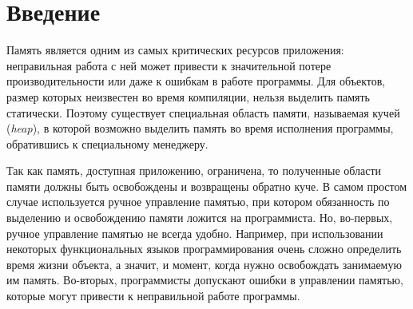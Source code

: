 \documentclass[14pt]{matmex-diploma}
\begin{document}

\maketitle
\tableofcontents

\section*{Введение}
Память является одним из самых критических ресурсов приложения: неправильная работа с ней
может привести к значительной потере производительности или даже к ошибкам в
работе программы. Для объектов, размер которых неизвестен во время компиляции, нельзя выделить память статически. Поэтому существует специальная область памяти, называемая кучей (\textit{heap}),
в которой возможно выделить память во время исполнения программы, обратившись к специальному менеджеру.

Так как память, доступная приложению, ограничена, то полученные области памяти должны быть освобождены и возвращены обратно куче. В самом простом случае используется ручное управление памятью, при котором обязанность по выделению и освобождению памяти ложится на программиста. Но, во-первых, ручное управление памятью не всегда удобно.
Например, при использовании некоторых функциональных языков программирования очень сложно
определить время жизни объекта, а значит, и момент, когда нужно освобождать занимаемую им память. Во-вторых, программисты допускают ошибки в управлении памятью,
которые могут привести к неправильной работе программы. 
\end{document}
